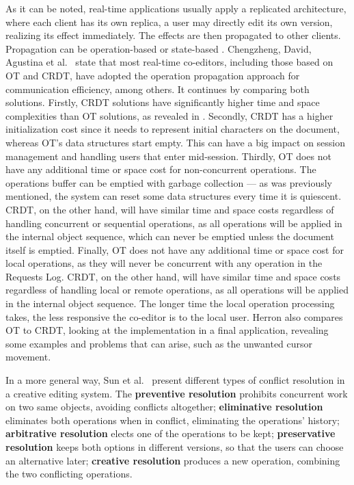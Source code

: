 As it can be noted, real-time applications usually apply a replicated architecture, where each client has its own replica, a user may directly edit its own version, realizing its effect immediately. The effects are then propagated to other clients.
Propagation can be operation-based \cite{Oster2006} \cite{Sun1998-ot} \cite{Sun1998} \cite{Weiss2009} or state-based \cite{Fraser2009}. Chengzheng, David, Agustina et al.\ \cite{Chengzheng2020} state that most real-time co-editors, including those based on OT and CRDT, have adopted the operation propagation approach for communication efficiency, among others. It continues by comparing both solutions. Firstly, CRDT solutions have significantly higher time and space complexities than OT solutions, as revealed in \cite{Sun2020}. Secondly, CRDT has a higher initialization cost since it needs to represent initial characters on the document, whereas OT's data structures start empty. This can have a big impact on session management and handling users that enter mid-session. Thirdly, OT does not have any additional time or space cost for non-concurrent operations. The operations buffer can be emptied with garbage collection --- as was previously mentioned, the system can reset some data structures every time it is quiescent. CRDT, on the other hand, will have similar time and space costs regardless of handling concurrent or sequential operations, as all operations will be applied in the internal object sequence, which can never be emptied unless the document itself is emptied. Finally, OT does not have any additional time or space cost for local operations, as they will never be concurrent with any operation in the Requests Log. CRDT, on the other hand, will have similar time and space costs regardless of handling local or remote operations, as all operations will be applied in the internal object sequence. The longer time the local operation processing takes, the less responsive the co-editor is to the local user. Herron \cite{Herron-ot-crdt} also compares OT to CRDT, looking at the implementation in a final application, revealing some examples and problems that can arise, such as the unwanted cursor movement.

In a more general way, Sun et al.\ \cite{Sun2012} present different types of conflict resolution in a creative editing system. The \textbf{preventive resolution} prohibits concurrent work on two same objects, avoiding conflicts altogether; \textbf{eliminative resolution} eliminates both operations when in conflict, eliminating the operations' history; \textbf{arbitrative resolution} elects one of the operations to be kept; \textbf{preservative resolution} keeps both options in different versions, so that the users can choose an alternative later; \textbf{creative resolution} produces a new operation, combining the two conflicting operations.

